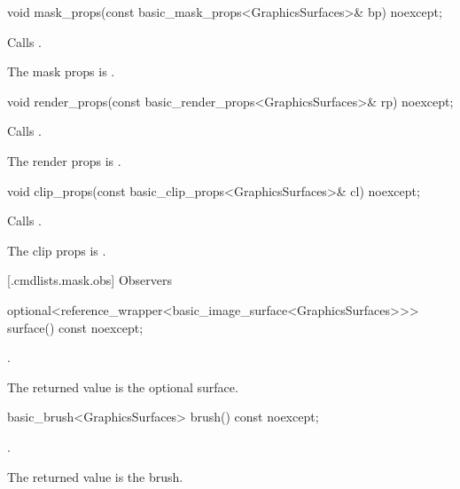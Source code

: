 %
\begin{itemdecl}
void mask_props(const basic_mask_props<GraphicsSurfaces>& bp) noexcept;
\end{itemdecl}
\begin{itemdescr}
\pnum
\effects Calls .

\pnum
\remarks The mask props is .
\end{itemdescr}

%
\begin{itemdecl}
void render_props(const basic_render_props<GraphicsSurfaces>& rp) noexcept;
\end{itemdecl}
\begin{itemdescr}
\pnum
\effects Calls .

\pnum
\remarks The render props is .
\end{itemdescr}

%
\begin{itemdecl}
void clip_props(const basic_clip_props<GraphicsSurfaces>& cl) noexcept;
\end{itemdecl}
\begin{itemdescr}
\pnum
\effects Calls .

\pnum
\remarks The clip props is .
\end{itemdescr}

 [\iotwod.cmdlists.mask.obs] {Observers}%

%
\begin{itemdecl}
optional<reference_wrapper<basic_image_surface<GraphicsSurfaces>>> 
  surface() const noexcept;
\end{itemdecl}
\begin{itemdescr}
\pnum
\returns {}.

\pnum
\remarks
The returned value is the optional surface.
\end{itemdescr}

%
\begin{itemdecl}
basic_brush<GraphicsSurfaces> brush() const noexcept;
\end{itemdecl}
\begin{itemdescr}
\pnum
\returns {}.

\pnum
\remarks The returned value is the brush.
\end{itemdescr}


